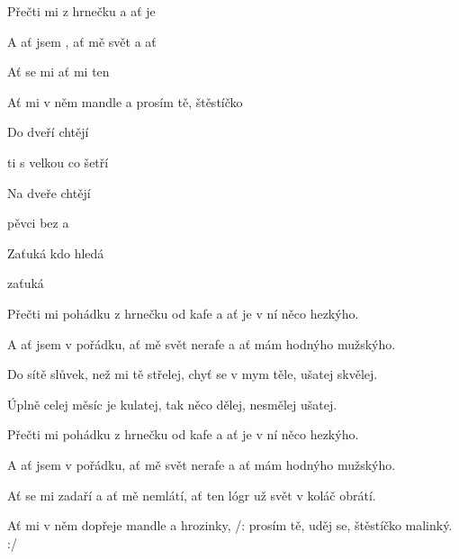 

\zs
Přečti mi  z hrnečku 
a ať je  

A ať jsem , ať mě svět 
a ať  

Ať se mi  
ať mi ten  

Ať mi v něm  mandle a 
prosím tě,  štěstíčko 
\ks

\zr
Do dveří  chtějí 

ti s velkou  co šetří 

Na dveře  chtějí 

pěvci bez  a 

Zaťuká  kdo hledá 

zaťuká   
\kr

\zs
Přečti mi pohádku z hrnečku od kafe
a ať je v ní něco hezkýho.

A ať jsem v pořádku, ať mě svět nerafe
a ať mám hodnýho mužskýho.

Do sítě slůvek, než mi tě střelej,
chyť se v mym těle, ušatej skvělej.

Úplně celej měsíc je kulatej,
tak něco dělej, nesmělej ušatej.
\ks

\zr \kr

\zs
Přečti mi pohádku z hrnečku od kafe
a ať je v ní něco hezkýho.

A ať jsem v pořádku, ať mě svět nerafe
a ať mám hodnýho mužskýho.

Ať se mi zadaří a ať mě nemlátí,
ať ten lógr už svět v koláč obrátí.

Ať mi v něm dopřeje mandle a hrozinky,
/: prosím tě, uděj se, štěstíčko malinký. :/
\ks

\kp
